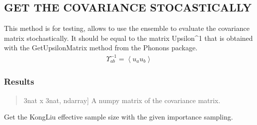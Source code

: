 \documentclass[a4paper,11pt,english]{sphinxmanual}
\begin{document}
\begin{fulllineitems}
\begin{fulllineitems}
\label{\detokenize{apireference:sscha.Ensemble.Ensemble.get_covmat_from_ensemble}}
\pysigstartsignatures
{}
\pysigstopsignatures

\subsection{GET THE COVARIANCE STOCASTICALLY}
\label{\detokenize{apireference:get-the-covariance-stocastically}}
\sphinxAtStartPar
This method is for testing, allows to use the ensemble to
evaluate the covariance matrix stochastically. It should be equal
to the matrix Upsilon\textasciicircum{}\sphinxhyphen{}1 that is obtained with the GetUpsilonMatrix method
from the Phonons package.
\begin{equation*}
\begin{split}\Upsilon^{-1}_{ab} = \left< u_a u_b\right>\end{split}
\end{equation*}

\subsubsection{Results}
\label{\detokenize{apireference:results}}\begin{quote}
\begin{description}
\sphinxlineitem{cov\_mat}{[}3nat x 3nat, ndarray{]}
\sphinxAtStartPar
A numpy matrix of the covariance matrix.

\end{description}
\end{quote}

\end{fulllineitems}


\begin{fulllineitems}
\label{\detokenize{apireference:sscha.Ensemble.Ensemble.get_effective_sample_size}}
\pysigstartsignatures
{}
\pysigstopsignatures
\sphinxAtStartPar
Get the Kong\sphinxhyphen{}Liu effective sample size with the given importance sampling.

\end{fulllineitems}


\end{fulllineitems}
\end{document}

